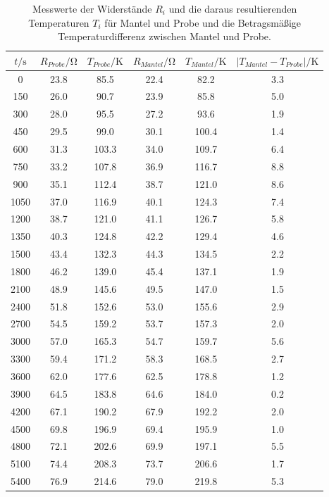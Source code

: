 \begin{table}  %
  \centering
  \caption{Messwerte der Widerstände $R_i$ und die daraus resultierenden Temperaturen $T_i$ für Mantel und Probe und die Betragsmäßige Temperaturdifferenz zwischen Mantel und Probe.}
  \label{tab:Messwerte}
  \begin{tabular}{c c c c c c}
  \toprule
  $t/\si{\second}$ & $R_{Probe}/\si{\ohm}$ & $T_{Probe}/\si{\kelvin}$ & $R_{Mantel}/\si{\ohm}$ & $T_{Mantel}/\si{\kelvin}$ & $|T_{Mantel}-T_{Probe}|/\si{\kelvin}$\\
  \midrule
  0	&	23.8	&	85.5	&	22.4	&	82.2	&	3.3   \\
  150	&	26.0	&	90.7	&	23.9	&	85.8	&	5.0   \\
  300	&	28.0	&	95.5	&	27.2	&	93.6	&	1.9   \\
  450	&	29.5	&	99.0	&	30.1	&	100.4	&	1.4   \\
  600	&	31.3	&	103.3	&	34.0	&	109.7	&	6.4   \\
  750	&	33.2	&	107.8	&	36.9	&	116.7	&	8.8   \\
  900	&	35.1	&	112.4	&	38.7	&	121.0	&	8.6   \\
  1050	&	37.0	&	116.9	&	40.1	&	124.3	&	7.4   \\
  1200	&	38.7	&	121.0	&	41.1	&	126.7	&	5.8   \\
  1350	&	40.3	&	124.8	&	42.2	&	129.4	&	4.6   \\
  1500	&	43.4	&	132.3	&	44.3	&	134.5	&	2.2   \\
  1800	&	46.2	&	139.0	&	45.4	&	137.1	&	1.9   \\
  2100	&	48.9	&	145.6	&	49.5	&	147.0	&	1.5   \\
  2400	&	51.8	&	152.6	&	53.0	&	155.6	&	2.9   \\
  2700	&	54.5	&	159.2	&	53.7	&	157.3	&	2.0   \\
  3000	&	57.0	&	165.3	&	54.7	&	159.7	&	5.6   \\
  3300	&	59.4	&	171.2	&	58.3	&	168.5	&	2.7   \\
  3600	&	62.0	&	177.6	&	62.5	&	178.8	&	1.2   \\
  3900	&	64.5	&	183.8	&	64.6	&	184.0	&	0.2   \\
  4200	&	67.1	&	190.2	&	67.9	&	192.2	&	2.0   \\
  4500	&	69.8	&	196.9	&	69.4	&	195.9	&	1.0   \\
  4800	&	72.1	&	202.6	&	69.9	&	197.1	&	5.5   \\
  5100	&	74.4	&	208.3	&	73.7	&	206.6	&	1.7   \\
  5400	&	76.9	&	214.6	&	79.0	&	219.8	&	5.3   \\

\end{tabular}
\end{table}
